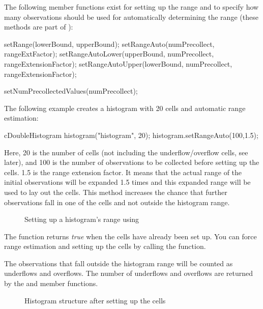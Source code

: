 The following member functions exist for setting up the range
and to specify how many observations should be used for automatically
determining the range (these methods are part of ):

\begin{cpp}
setRange(lowerBound, upperBound);
setRangeAuto(numPrecollect, rangeExtFactor);
setRangeAutoLower(upperBound, numPrecollect, rangeExtensionFactor);
setRangeAutoUpper(lowerBound, numPrecollect, rangeExtensionFactor);
\end{cpp}

\begin{cpp}
setNumPrecollectedValues(numPrecollect);
\end{cpp}

The following example creates a histogram with 20 cells and automatic
range estimation:

\begin{cpp}
cDoubleHistogram histogram("histogram", 20);
histogram.setRangeAuto(100,1.5);
\end{cpp}

Here, 20 is the number of cells (not including the underflow/overflow
cells, see later), and 100 is the number of observations to be
collected before setting up the cells. 1.5 is the range extension
factor. It means that the actual range of the initial observations
will be expanded 1.5 times and this expanded range will be used to lay
out the cells. This method increases the chance that further
observations fall in one of the cells and not outside the histogram
range.

\begin{figure}[htbp]
  \begin{center}
    
    \caption{Setting up a histogram's range using }
  \end{center}
\end{figure}

The  function returns \textit{true} when the cells have
already been set up. You can force range estimation and setting
up the cells by calling the  function.

The observations that fall outside the histogram range will be counted
as underflows and overflows. The number of underflows and overflows
are returned by the  and 
member functions.

\begin{figure}[htbp]
  \begin{center}
    
    \caption{Histogram structure after setting up the cells}
  \end{center}
\end{figure}


